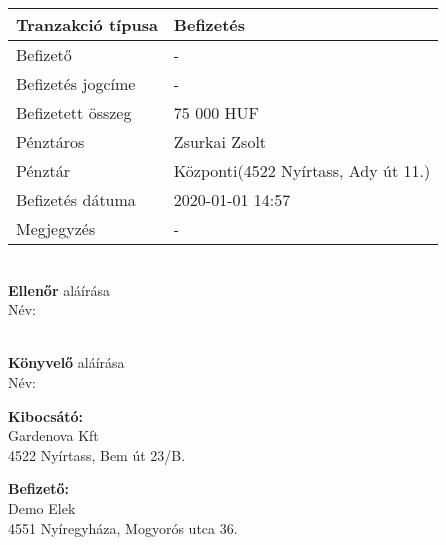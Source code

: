\documentclass{article}
\begin{document}
\rule[2\baselineskip]{0pt}{0pt}

\noindent\makebox[6.45in]{\rule{\paperwidth}{0.4pt}}

\rule[2\baselineskip]{0pt}{0pt}

\begin{minipage}[t]{0.45\textwidth}
  \renewcommand{\arraystretch}{1.5}
  \begin{tabular}{ |p{3cm}|p{4cm}| }
    \hline
    Tranzakció típusa & Befizetés                                         \\
    \hline
    Befizető          & -                                                 \\
    \hline
    Befizetés jogcíme & -                                                 \\
    \hline
    Befizetett összeg & 75 000 HUF                                        \\
    \hline
    Pénztáros         & Zsurkai Zsolt                                     \\
    \hline
    Pénztár           & Központi\footnotemark (4522 Nyírtass, Ady út 11.) \\
    \hline
    Befizetés dátuma  & 2020-01-01 14:57                                  \\
    \hline
    Megjegyzés        & -                                                 \\
    \hline
  \end{tabular}
\end{minipage}
\hfill
\begin{minipage}[t]{0.45\textwidth}
  \makebox[2.5in]{\hrulefill} \\
  {\bf Ellenőr} aláírása \\
  Név:

  \bigskip
  \makebox[2.5in]{\hrulefill} \\
  {\bf Könyvelő} aláírása\\
  Név:
\end{minipage}

\newpage

\rule[2\baselineskip]{0pt}{0pt}%
\begin{minipage}[t]{0.45\textwidth}
  \textbf {Kibocsátó:}\\
  Gardenova Kft\\
  4522 Nyírtass, Bem út 23/B.
\end{minipage}
\hfill
\begin{minipage}[t]{0.45\textwidth}
  \textbf {Befizető:}\\
  Demo Elek\\
  4551 Nyíregyháza, Mogyorós utca 36.
\end{minipage}
\end{document}
